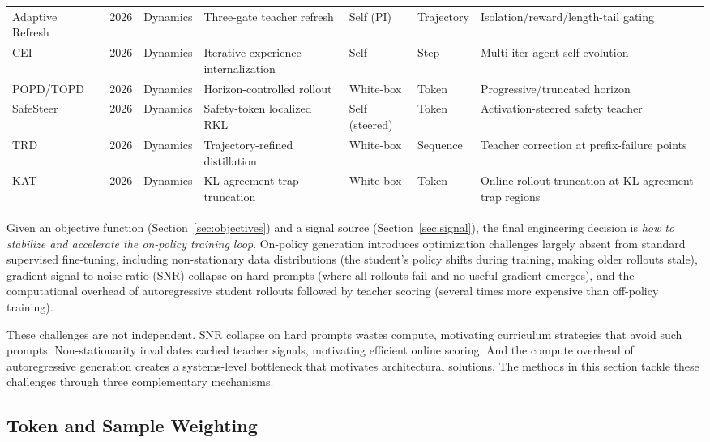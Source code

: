 \documentclass{article} %
\begin{document}
\begin{table}[t]
{\begin{tabular}{@{}lclllll@{}}
        Adaptive Refresh~\citep{2606.03532} & 2026 & Dynamics & Three-gate teacher refresh & Self (PI) & Trajectory & Isolation/reward/length-tail gating \\
        CEI~\citep{2606.04703} & 2026 & Dynamics & Iterative experience internalization & Self & Step & Multi-iter agent self-evolution \\
        POPD/TOPD~\citep{2605.31490} & 2026 & Dynamics & Horizon-controlled rollout & White-box & Token & Progressive/truncated horizon \\
        SafeSteer~\citep{2606.02530} & 2026 & Dynamics & Safety-token localized RKL & Self (steered) & Token & Activation-steered safety teacher \\
        TRD~\citep{2606.08432} & 2026 & Dynamics & Trajectory-refined distillation & White-box & Sequence & Teacher correction at prefix-failure points \\
        KAT~\citep{2606.09471} & 2026 & Dynamics & KL-agreement trap truncation & White-box & Token & Online rollout truncation at KL-agreement trap regions \\
        \bottomrule
    \end{tabular}
    }
\end{table}

Given an objective function (Section~\ref{sec:objectives}) and a signal source (Section~\ref{sec:signal}), the final engineering decision is \emph{how to stabilize and accelerate the on-policy training loop}. On-policy generation introduces optimization challenges largely absent from standard supervised fine-tuning, including non-stationary data distributions (the student's policy shifts during training, making older rollouts stale), gradient signal-to-noise ratio (SNR) collapse on hard prompts (where all rollouts fail and no useful gradient emerges), and the computational overhead of autoregressive student rollouts followed by teacher scoring (several times more expensive than off-policy training).

These challenges are not independent. SNR collapse on hard prompts wastes compute, motivating curriculum strategies that avoid such prompts. Non-stationarity invalidates cached teacher signals, motivating efficient online scoring. And the compute overhead of autoregressive generation creates a systems-level bottleneck that motivates architectural solutions. The methods in this section tackle these challenges through three complementary mechanisms.

\subsection{Token and Sample Weighting}
\label{subsec:weighting}
\end{document}

